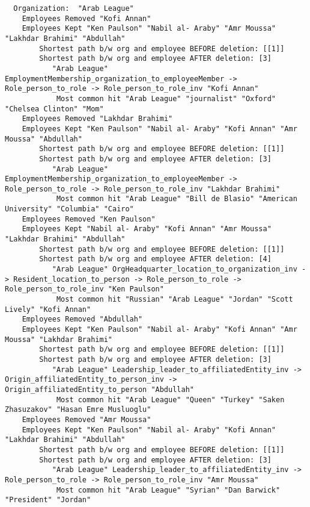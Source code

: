 \documentclass{tufte-handout}
\begin{document}
\begin{enumerate}
\begin{lstlisting}
  Organization:  "Arab League"
    Employees Removed "Kofi Annan"
    Employees Kept "Ken Paulson" "Nabil al- Araby" "Amr Moussa" "Lakhdar Brahimi" "Abdullah"
        Shortest path b/w org and employee BEFORE deletion: [[1]]
        Shortest path b/w org and employee AFTER deletion: [3]
           "Arab League" EmploymentMembership_organization_to_employeeMember -> Role_person_to_role -> Role_person_to_role_inv "Kofi Annan"
            Most common hit "Arab League" "journalist" "Oxford" "Chelsea Clinton" "Mom"
    Employees Removed "Lakhdar Brahimi"
    Employees Kept "Ken Paulson" "Nabil al- Araby" "Kofi Annan" "Amr Moussa" "Abdullah"
        Shortest path b/w org and employee BEFORE deletion: [[1]]
        Shortest path b/w org and employee AFTER deletion: [3]
           "Arab League" EmploymentMembership_organization_to_employeeMember -> Role_person_to_role -> Role_person_to_role_inv "Lakhdar Brahimi"
            Most common hit "Arab League" "Bill de Blasio" "American University" "Columbia" "Cairo"
    Employees Removed "Ken Paulson"
    Employees Kept "Nabil al- Araby" "Kofi Annan" "Amr Moussa" "Lakhdar Brahimi" "Abdullah"
        Shortest path b/w org and employee BEFORE deletion: [[1]]
        Shortest path b/w org and employee AFTER deletion: [4]
           "Arab League" OrgHeadquarter_location_to_organization_inv -> Resident_location_to_person -> Role_person_to_role -> Role_person_to_role_inv "Ken Paulson"
            Most common hit "Russian" "Arab League" "Jordan" "Scott Lively" "Kofi Annan"
    Employees Removed "Abdullah"
    Employees Kept "Ken Paulson" "Nabil al- Araby" "Kofi Annan" "Amr Moussa" "Lakhdar Brahimi"
        Shortest path b/w org and employee BEFORE deletion: [[1]]
        Shortest path b/w org and employee AFTER deletion: [3]
           "Arab League" Leadership_leader_to_affiliatedEntity_inv -> Origin_affiliatedEntity_to_person_inv -> Origin_affiliatedEntity_to_person "Abdullah"
            Most common hit "Arab League" "Queen" "Turkey" "Saken Zhasuzakov" "Hasan Emre Musluoglu"
    Employees Removed "Amr Moussa"
    Employees Kept "Ken Paulson" "Nabil al- Araby" "Kofi Annan" "Lakhdar Brahimi" "Abdullah"
        Shortest path b/w org and employee BEFORE deletion: [[1]]
        Shortest path b/w org and employee AFTER deletion: [3]
           "Arab League" Leadership_leader_to_affiliatedEntity_inv -> Role_person_to_role -> Role_person_to_role_inv "Amr Moussa"
            Most common hit "Arab League" "Syrian" "Dan Barwick" "President" "Jordan"
\end{lstlisting}


\end{enumerate}
\end{document}
